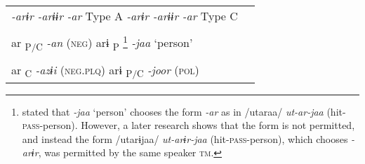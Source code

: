 \begin{table}
\begin{tabular}{ll}
\textit{-arɨr  -arɨɨr  -ar} Type A    \textit{-arɨr  -arɨɨr  -ar} Type C                                                                                                                                                                                                                                                                                                                                                                                                                                                        \\
                                                                                                                                                                                                                                                                                                                                                                                                                                                                                                                                \\
    ar\textsubscript{ P/C}  \textit{-an} (\textsc{neg})    arɨ\textsubscript{ P}{} \footnote{\citet[70]{Niinaga2010} stated that \textit{-jaa} ‘person’ chooses the form \textit{-ar} as in /utaraa/ \textit{ut-ar-jaa} (hit-\textsc{pass}-person). However, a later research shows that the form is not permitted, and instead the form /utarɨjaa/ \textit{ut-arɨr-jaa} (hit-\textsc{pass}-person), which chooses \textit{-arɨr}, was permitted by the same speaker \textsc{tm}.}      \textit{-jaa} ‘person’                  \\
                                                                                                                                                                                                                                                                                                                                                                                                                                                                                                                                \\
    ar\textsubscript{ C}  \textit{-azɨi} (\textsc{neg}.\textsc{plq})    arɨ\textsubscript{ P/C}      \textit{-joor} (\textsc{pol})                                                                                                                                                                                                                                                                                                                                                                                              \\

\end{tabular}
\end{table}
